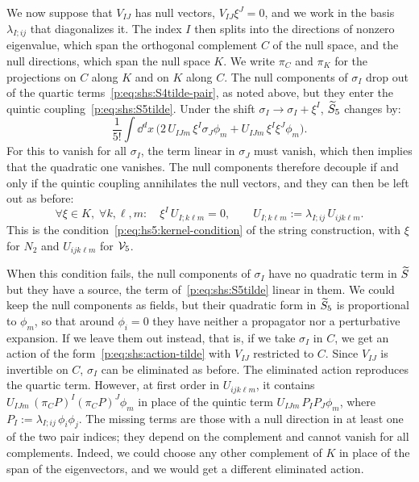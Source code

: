We now suppose that $V_{IJ}$ has null vectors, $V_{IJ} \xi^J = 0$, and we work in the basis $\lambda_{I;ij}$ that diagonalizes it.
The index $I$ then splits into the directions of nonzero eigenvalue, which span the orthogonal complement $C$ of the null space, and the null directions, which span the null space $K$.
We write $\pi_C$ and $\pi_K$ for the projections on $C$ along $K$ and on $K$ along $C$.
The null components of $\sigma_I$ drop out of the quartic terms~\eqref{p:eq:shs:S4tilde-pair}, as noted above, but they enter the quintic coupling~\eqref{p:eq:shs:S5tilde}.
Under the shift $\sigma_I \to \sigma_I + \xi^I$, $\caction[5]$ changes by:
\begin{equation}
\label{p:eq:shs:null-shift}
\frac{1}{5!} \int \dd^d x \, \big(
  2 \, U_{IJm} \, \xi^I \sigma_J \phi_m
  + U_{IJm} \, \xi^I \xi^J \phi_m
\big).
\end{equation}
For this to vanish for all $\sigma_I$, the term linear in $\sigma_J$ must vanish, which then implies that the quadratic one vanishes.
The null components therefore decouple if and only if the quintic coupling annihilates the null vectors, and they can then be left out as before:
\begin{equation}
\label{p:eq:shs:kernel-condition}
\forall \xi \in K, \;
\forall k, \ell, m:
\quad
\xi^I \, U_{I;k\ell m}
  = 0,
\qquad
U_{I;k\ell m}
  := \lambda_{I;ij} \, U_{ijk\ell m}.
\end{equation}
This is the condition~\eqref{p:eq:hs5:kernel-condition} of the string construction, with $\xi$ for $N_2$ and $U_{ijk\ell m}$ for $\vertex{5}$.

When this condition fails, the null components of $\sigma_I$ have no quadratic term in $\caction$ but they have a source, the term of~\eqref{p:eq:shs:S5tilde} linear in them.
  We could keep the null components as fields, but their quadratic form in $\caction[5]$ is proportional to $\phi_m$, so that around $\phi_i = 0$ they have neither a propagator nor a perturbative expansion.
  If we leave them out instead, that is, if we take $\sigma_I$ in $C$, we get an action of the form~\eqref{p:eq:shs:action-tilde} with $V_{IJ}$ restricted to $C$.
  Since $V_{IJ}$ is invertible on $C$, $\sigma_I$ can be eliminated as before.
  The eliminated action reproduces the quartic term.
  However, at first order in $U_{ijk\ell m}$, it contains $U_{IJm} \, (\pi_C P)^I (\pi_C P)^J \phi_m$ in place of the quintic term $U_{IJm} \, P_I P_J \phi_m$, where $P_I := \lambda_{I;ij} \, \phi_i \phi_j$.
  The missing terms are those with a null direction in at least one of the two pair indices; they depend on the complement and cannot vanish for all complements.
  Indeed, we could choose any other complement of $K$ in place of the span of the eigenvectors, and we would get a different eliminated action.

